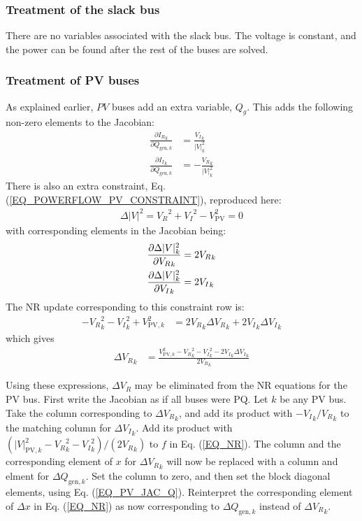 \documentclass[10pt]{article}
\newcommand{\Vr}{{V_R}}
\newcommand{\Vi}{{V_I}}
\newcommand{\Ir}{{I_R}}
\newcommand{\Ii}{{I_I}}
\begin{document}
\subsubsection{Treatment of the slack bus}
There are no variables associated with the slack bus. The voltage is constant, and the power can be found after the rest of the buses are solved.

\subsubsection{Treatment of PV buses}
As explained earlier, $PV$ buses add an extra variable, $Q_g$. This adds the following non-zero elements to the Jacobian:
\begin{align}
\frac{\partial \Ir_k}{\partial Q_{\text{gen},k}} &= \frac{\Vi_k}{|V|_k^2} \\
\frac{\partial \Ii_k}{\partial Q_{\text{gen},k}} &= -\frac{\Vr_k}{|V|_k^2}
\end{align}
There is also an extra constraint, Eq. (\ref{EQ_POWERFLOW_PV_CONSTRAINT}), reproduced here:
\begin{align}
\Delta |V|^2 = \Vr^2 + \Vi^2 - V_\text{PV}^2 = 0
\label{EQ_POWERFLOW_PV_CONSTRAINT_AGAIN}
\end{align}
with corresponding elements in the Jacobian being:
\begin{align}
\frac{\partial \Delta|V|^2_k}{\partial \Vr_k} &= 2 \Vr_k \notag \\
\frac{\partial \Delta|V|^2_k}{\partial \Vi_k} &= 2 \Vi_k
\label{EQ_PV_JAC_Q}
\end{align}
The NR update corresponding to this constraint row is:
\begin{align}
	-\Vr_k^2 - \Vi_k^2 + V_{\text{PV},k}^2 &= 2\Vr_k\Delta\Vr_k + 2\Vi_k\Delta\Vi_k
\end{align}
which gives
\begin{align}
\Delta \Vr_k &= \frac{V^2_{\text{PV},k} - \Vr_k^2 - \Vi_k^2- 2\Vi_k\Delta \Vi_k}{2\Vr_k}
\end{align}

Using these expressions, $\Delta \Vr$ may be eliminated from the NR equations for the PV bus. First write the Jacobian as if all buses were PQ. Let $k$ be any PV bus. Take the column corresponding to $\Delta \Vr_k$, and add its product with $-\Vi_k/\Vr_k$ to the matching column for  $\Delta \Vi_k$. Add its product with $(|V|^2_{\text{PV},k} - \Vr_k^2 - \Vi_k^2)/(2\Vr_k)$ to $f$ in Eq. (\ref{EQ_NR}). The column and the corresponding element of $x$ for $\Delta \Vr_k$ will now be replaced with a column and elment for $\Delta Q_{\text{gen},k}$. Set the column to zero, and then set the block diagonal elements, using Eq. (\ref{EQ_PV_JAC_Q}). Reinterpret the corresponding element of $\Delta x$ in Eq. (\ref{EQ_NR}) as now corresponding to $\Delta Q_{\text{gen},k}$ instead of $\Delta \Vr_k$.
\end{document}
